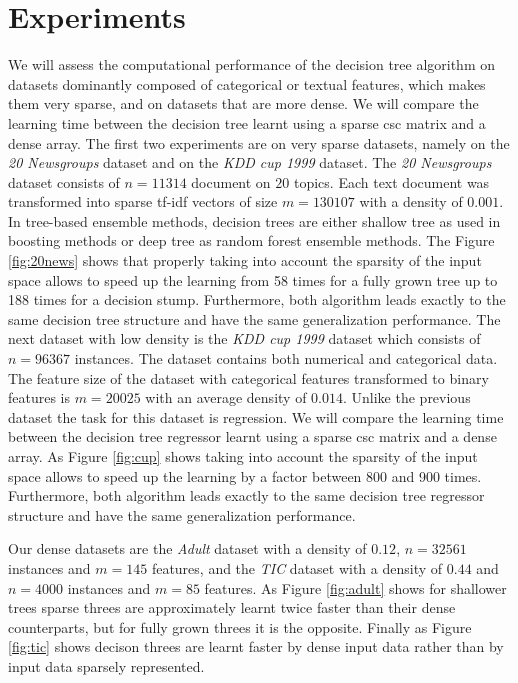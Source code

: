 \section{Experiments} \label{sec:experiments}

We will assess the computational performance of the decision tree algorithm on datasets dominantly composed of categorical or textual features, which makes them very sparse, and on datasets that are more dense. We will compare the learning time between the decision tree learnt
using a sparse csc matrix and a dense array.
The first two experiments are on very sparse datasets, namely on the \emph{20 Newsgroups} dataset \cite{joachims1996probabilistic} and on the \emph{KDD cup 1999} dataset\cite{bay2000archive}. The \emph{20 Newsgroups} dataset
consists of $n=11314$ document on $20$ topics. Each text document was
transformed into sparse tf-idf vectors of size $m=130107$ with a density of
$0.001$. 
In tree-based ensemble methods, decision trees are either shallow tree as used
in boosting methods or deep tree as random forest ensemble methods. The Figure
\ref{fig:20news} shows that properly taking into account the sparsity of the
input space allows to speed up the learning from 58 times for a fully grown
tree up to 188 times for a decision stump. Furthermore, both algorithm leads
exactly to the same decision tree structure and have the same generalization
performance. The next dataset with low density is the \emph{KDD cup 1999} dataset which consists of $n=96367$ instances. The dataset contains both numerical and categorical data. The feature size of the dataset with categorical features transformed to binary features is $m=20025$ with an average density of
$0.014$. Unlike the previous dataset the task for this dataset is regression. We will compare the learning time between the decision tree regressor learnt
using a sparse csc matrix and a dense array. As Figure \ref{fig:cup} shows taking into account the sparsity of the
input space allows to speed up the learning by a factor between 800 and 900 times. Furthermore, both algorithm leads
exactly to the same decision tree regressor structure and have the same generalization
performance.

Our dense datasets are the \emph{Adult} dataset\cite{Bache+Lichman:2013} with a density of $0.12$, $n=32561$ instances and  $m=145$ features, and the \emph{TIC} dataset\cite{Bache+Lichman:2013} with a density of $0.44$ and $n=4000$ instances and $m=85$ features. As Figure \ref{fig:adult} shows for shallower trees sparse threes are approximately learnt twice faster than their dense counterparts, but for fully grown threes it is the opposite. Finally as Figure \ref{fig:tic} shows decison threes are learnt faster by dense input data rather than by input data sparsely represented. 



